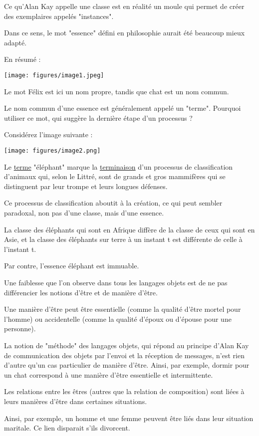 \documentclass[a4paper, 12pt, openright, french]{book}
\begin{document}
Ce qu'Alan Kay appelle une classe est en réalité un
moule qui permet de créer des exemplaires appelés "instances".

Dans ce sens, le mot "essence" défini en philosophie aurait été beaucoup
mieux adapté.

En résumé :

\texttt{[image: figures/image1.jpeg]}

Le mot Félix est ici un nom propre, tandis que chat est un nom commun.

Le nom commun d'une essence est généralement appelé un "terme". Pourquoi utiliser ce
mot, qui suggère la dernière étape d'un processus ?

Considérez l'image suivante :

\texttt{[image: figures/image2.png]}

Le \uline{terme} "éléphant" marque la \uline{terminaison}
d'un processus de classification d'animaux qui, selon
le Littré, sont de grands et gros mammifères qui se distinguent par leur
trompe et leurs longues défenses.

Ce processus de classification aboutit à la création, ce qui peut
sembler paradoxal, non pas d'une classe, mais
d'une essence.

La classe des éléphants qui sont en Afrique diffère de la classe de ceux
qui sont en Asie, et la classe des éléphants sur terre à un instant t
est différente de celle à l'instant t\textquotesingle.

Par contre, l'essence éléphant est immuable.

Une faiblesse que l'on observe dans tous les langages
objets est de ne pas
différencier les notions d'être et de manière
d'être.

Une manière d'être peut être essentielle (comme la
qualité d'être mortel pour l'homme) ou
accidentelle (comme la qualité d'époux ou
d'épouse pour une personne).

La notion de "méthode" des langages objets, qui répond au principe d'Alan Kay
de communication des objets par l'envoi et la réception de messages,
n'est rien d'autre qu'un
cas particulier de manière d'être. Ainsi, par exemple,
dormir pour un chat correspond à une manière
d'être essentielle et intermittente.

Les relations entre les êtres
(autres que la relation de composition) sont liées à leurs manières
d'être dans certaines situations.

Ainsi, par exemple, un homme et une femme peuvent être liés dans leur
situation maritale. Ce lien disparait s'ils divorcent.
\end{document}
